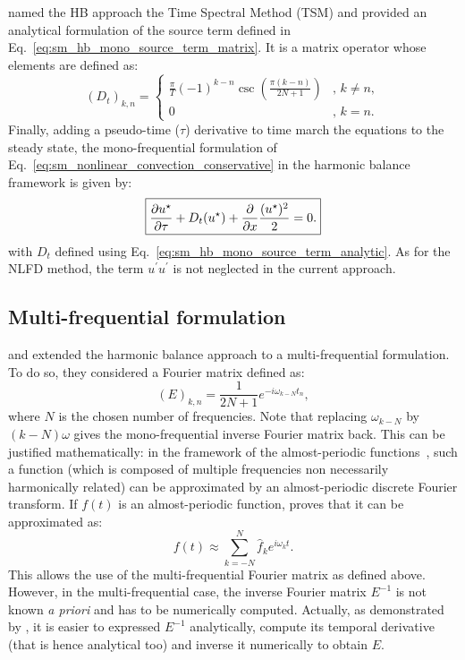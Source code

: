 \citet{Gopinath2005} named the HB approach the 
Time Spectral Method (TSM) and provided 
an analytical formulation of the
source term defined in Eq.~\eqref{eq:sm_hb_mono_source_term_matrix}.
It is a matrix operator whose elements are defined as:
\begin{equation}
  (D_t)_{k, n} =
  \begin{cases}
    \frac{\pi}{T}(-1)^{k-n}\csc\left(\frac{\pi
        (k-n)}{2N+1}\right) &, \, k\neq n,\\
    0 &, \, k=n.
  \end{cases}
  \label{eq:sm_hb_mono_source_term_analytic}
\end{equation}
Finally, adding a pseudo-time ($\tau$) derivative to 
time march the equations to the steady state, 
the mono-frequential formulation of 
Eq.~\eqref{eq:sm_nonlinear_convection_conservative} in the harmonic
balance framework is given by:
\begin{equation}
	\fbox{$
	\displaystyle \frac{\partial u^\star}{\partial \tau} + 
	D_t (u^\star) + 
	\displaystyle \frac{\partial}{\partial x}
		\frac{(u^\star)^2}{2} = 0.
	$}
\end{equation}
with $D_t$ defined using Eq.~\eqref{eq:sm_hb_mono_source_term_analytic}.
As for the NLFD method, the term $u^\prime u^\prime$
is not neglected in the current approach.

\subsection{Multi-frequential formulation}
\label{sec:sm_hb_multi}
\citet{Gopinath2007} and \citet{Ekici2007} 
extended the harmonic balance approach to
a multi-frequential formulation. To do so, they considered
a Fourier matrix defined as:
\begin{equation}
	(E)_{k,n} = \frac{1}{2N+1} e^{-i \omega_{k-N} t_n},
\end{equation}
where $N$ is the chosen number of frequencies.
Note that replacing $\omega_{k-N}$ by $(k - N) \omega$ gives
the mono-frequential inverse Fourier matrix back. 
This can be justified mathematically: in the
framework of the almost-periodic functions~\cite{Besicovitch1932},
such a function (which is composed of multiple
frequencies non necessarily harmonically related) can be approximated
by an almost-periodic
discrete Fourier transform. If $f(t)$ is an almost-periodic function,
\citet{Besicovitch1932} proves that it can be approximated as:
\begin{equation}
	f(t) \approx \sum_{k=-N}^{N} \widehat{f}_k 
	e^{i \omega_k t}.
\end{equation}
This allows the use of the multi-frequential Fourier matrix as defined
above. However, in the multi-frequential case, the inverse Fourier matrix
$E^{-1}$ is not known \textit{a priori} 
and has to be numerically computed. Actually, as demonstrated by 
\citet{Gopinath2007}, it is easier to expressed $E^{-1}$ analytically,
compute its temporal derivative (that is hence analytical too) 
and inverse it numerically to obtain $E$.

